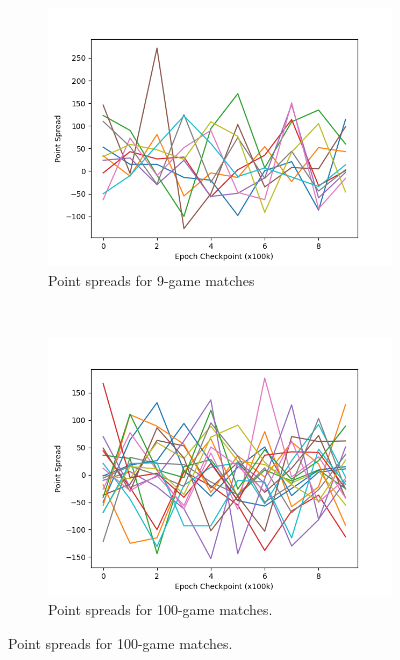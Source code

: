 
\begin{figure}
\center
\begin{subfigure}[b]{0.45\textwidth}
	\center
	\includegraphics[width=\textwidth]{images/discussion/usefulness/r2-time-series-9.png}
	\caption{Point spreads for 9-game matches} %
	\label{r2-time-series-9}
\end{subfigure}
~
\begin{subfigure}[b]{0.45\textwidth}
	\center
	\includegraphics[width=\textwidth]{images/discussion/usefulness/r2-time-series-100.png}
	\caption{Point spreads for 100-game matches.}
	\label{r2-time-series-100}
\end{subfigure}


\end{figure}

